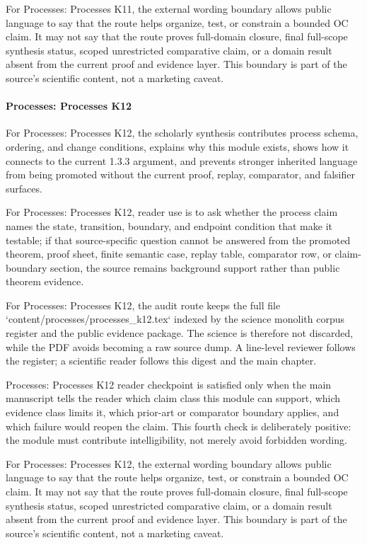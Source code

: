 For Processes: Processes K11, the external wording boundary allows public language to say that the route helps organize, test, or constrain a bounded OC claim. It may not say that the route proves full-domain closure, final full-scope synthesis status, scoped unrestricted comparative claim, or a domain result absent from the current proof and evidence layer. This boundary is part of the source's scientific content, not a marketing caveat.


\paragraph{Processes: Processes K12}

For Processes: Processes K12, the scholarly synthesis contributes process schema, ordering, and change conditions, explains why this module exists, shows how it connects to the current 1.3.3 argument, and prevents stronger inherited language from being promoted without the current proof, replay, comparator, and falsifier surfaces.


For Processes: Processes K12, reader use is to ask whether the process claim names the state, transition, boundary, and endpoint condition that make it testable; if that source-specific question cannot be answered from the promoted theorem, proof sheet, finite semantic case, replay table, comparator row, or claim-boundary section, the source remains background support rather than public theorem evidence.


For Processes: Processes K12, the audit route keeps the full file `content/processes/processes\_k12.tex` indexed by the science monolith corpus register and the public evidence package. The science is therefore not discarded, while the PDF avoids becoming a raw source dump. A line-level reviewer follows the register; a scientific reader follows this digest and the main chapter.


Processes: Processes K12 reader checkpoint is satisfied only when the main manuscript tells the reader which claim class this module can support, which evidence class limits it, which prior-art or comparator boundary applies, and which failure would reopen the claim. This fourth check is deliberately positive: the module must contribute intelligibility, not merely avoid forbidden wording.


For Processes: Processes K12, the external wording boundary allows public language to say that the route helps organize, test, or constrain a bounded OC claim. It may not say that the route proves full-domain closure, final full-scope synthesis status, scoped unrestricted comparative claim, or a domain result absent from the current proof and evidence layer. This boundary is part of the source's scientific content, not a marketing caveat.


